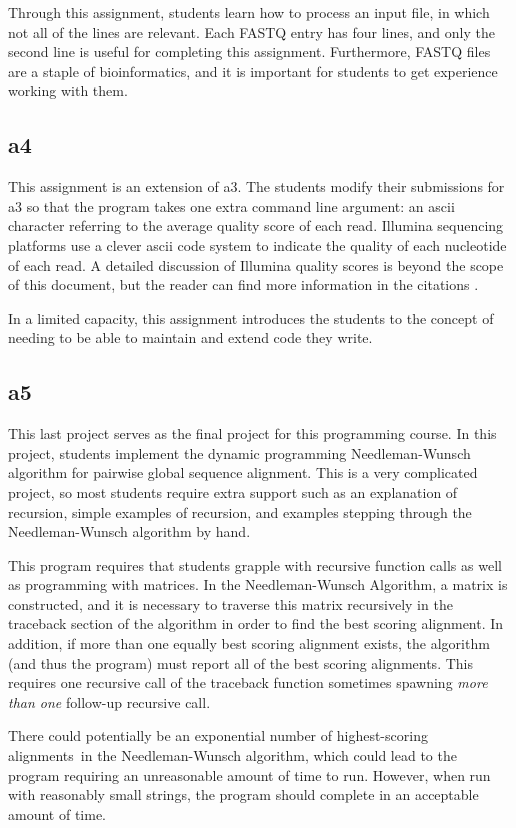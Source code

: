 \documentclass{report}
\begin{document}
Through this assignment, students learn how to process an input file, in which not all of the lines are relevant. Each FASTQ entry has four lines, and only the second line is useful for completing this assignment. Furthermore, FASTQ files are a staple of bioinformatics, and it is important for students to get experience working with them.

\subsection{a4}
This assignment is an extension of a3. The students modify their submissions for a3 so that the program takes one extra command line argument: an ascii character referring to the average quality score of each read. Illumina sequencing platforms use a clever ascii code system to indicate the quality of each nucleotide of each read. A detailed discussion of Illumina quality scores is beyond the scope of this document, but the reader can find more information in the citations \cite{cock2010sanger}.

In a limited capacity, this assignment introduces the students to the concept of needing to be able to maintain and extend code they write.

\subsection{a5}
This last project serves as the final project for this programming course. In this project, students implement the dynamic programming Needleman-Wunsch algorithm for pairwise global sequence alignment. This is a very complicated project, so most students require extra support such as an explanation of recursion, simple examples of recursion,  and examples stepping through the Needleman-Wunsch algorithm by hand. 

This program requires that students grapple with recursive function calls as well as programming with matrices. In the Needleman-Wunsch Algorithm, a matrix is constructed, and it is necessary to traverse this matrix recursively in the traceback section of the algorithm in order to find the best scoring alignment. In addition, if more than one equally best scoring alignment exists, the algorithm (and thus the program) must report all of the best scoring alignments. This requires one recursive call of the traceback function sometimes spawning \emph{more than one} follow-up recursive call. 

There could potentially be an exponential number of highest-scoring alignments~in the Needleman-Wunsch algorithm, which could lead to the program requiring an unreasonable amount of time to run. However, when run with reasonably small strings, the program should complete in an acceptable amount of time.
\end{document}
